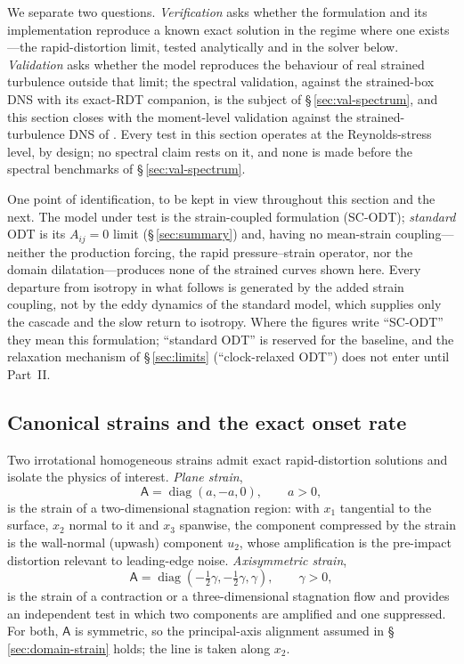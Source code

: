 \documentclass[11pt,a4paper]{article}
\begin{document}
We separate two questions. \emph{Verification} asks whether the
formulation and its implementation reproduce a known exact solution in
the regime where one exists---the rapid-distortion limit, tested
analytically and in the solver below. \emph{Validation} asks whether the
model reproduces the behaviour of real strained turbulence outside that
limit; the spectral validation, against the strained-box DNS with its
exact-RDT companion, is the subject of \S\,\ref{sec:val-spectrum}, and
this section closes with the moment-level validation against the
strained-turbulence DNS of \citet{LeeReynolds1985}. Every test in this
section operates at the Reynolds-stress level, by design; no spectral
claim rests on it, and none is made before the spectral benchmarks of
\S\,\ref{sec:val-spectrum}.

One point of identification, to be kept in view throughout this section
and the next. The model under test is the strain-coupled formulation
(SC-ODT); \emph{standard} ODT is its $A_{ij}=0$ limit
(\S\,\ref{sec:summary}) and, having no mean-strain coupling---neither
the production forcing, the rapid pressure--strain operator, nor the
domain dilatation---produces none of the strained curves shown here.
Every departure from isotropy in what follows is generated by the added
strain coupling, not by the eddy dynamics of the standard model, which
supplies only the cascade and the slow return to isotropy. Where the
figures write ``SC-ODT'' they mean this formulation; ``standard ODT''
is reserved for the baseline, and the relaxation mechanism of
\S\,\ref{sec:limits} (``clock-relaxed ODT'') does not enter until
Part~II.

\subsection{Canonical strains and the exact onset rate}\label{sec:onset}

Two irrotational homogeneous strains admit exact rapid-distortion
solutions and isolate the physics of interest. \emph{Plane strain},
\begin{equation}
  \mathsf{A}=\operatorname{diag}(a,-a,0),\qquad a>0,
  \label{eq:plane-strain}
\end{equation}
is the strain of a two-dimensional stagnation region: with $x_1$
tangential to the surface, $x_2$ normal to it and $x_3$ spanwise, the
component compressed by the strain is the wall-normal (upwash) component
$u_2$, whose amplification is the pre-impact distortion relevant to
leading-edge noise. \emph{Axisymmetric strain},
\begin{equation}
  \mathsf{A}=\operatorname{diag}(-\tfrac12\gamma,-\tfrac12\gamma,\gamma),
  \qquad \gamma>0,
  \label{eq:axi-strain}
\end{equation}
is the strain of a contraction or a three-dimensional stagnation flow and
provides an independent test in which two components are amplified and
one suppressed. For both, $\mathsf{A}$ is symmetric, so the
principal-axis alignment assumed in \S\,\ref{sec:domain-strain} holds;
the line is taken along $x_2$.
\end{document}
